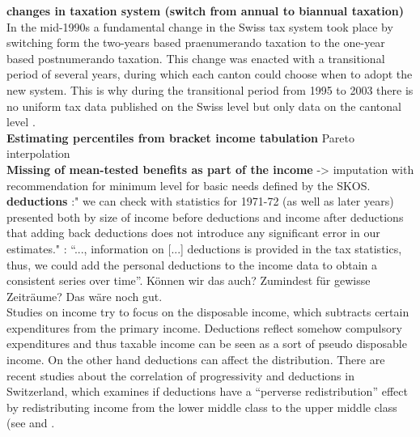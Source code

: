 \documentclass[twoside]{article}\usepackage[]{graphicx}\usepackage[]{color}
\begin{document}
\begin{multicols}{2}
\textbf{changes in taxation system  (switch from annual to biannual taxation)} In the mid-1990s a fundamental change in the Swiss tax system took place by switching form the two-years based praenumerando taxation to the one-year based postnumerando taxation. This change was enacted with a transitional period of several years, during which each canton could choose when to adopt the new system.  This is why during the transitional period from 1995 to 2003 there is no uniform tax data published on the Swiss level but only data on the cantonal level \citep[8f]{foellmi_volatile_2013}. \\

\textbf{Estimating percentiles from bracket income tabulation} Pareto interpolation \\ 

\textbf{Missing of mean-tested benefits as part of the income} -> imputation with recommendation for minimum level for basic needs defined by the SKOS.\\

\textbf{deductions} \citet[477]{dell_income_2007}:" we can check with statistics for 1971-72 (as well as later years) presented both by size of income before deductions and income after deductions that adding back deductions does not introduce any significant error in our estimates."
\citet[5]{schaltegger_evolution_2011 UNSICHER}: ``..., information on [...] deductions is provided in the tax statistics, thus, we could add the personal deductions to the income data to obtain a consistent series over time''. Können wir das auch? Zumindest für gewisse Zeiträume? Das wäre noch gut. \\

Studies on income try to focus on the disposable income, which subtracts certain expenditures from the primary income. Deductions reflect somehow compulsory expenditures and thus taxable income can be seen as a sort of pseudo disposable income. On the other hand deductions can affect the distribution. There are recent studies about the correlation of progressivity and deductions in Switzerland, which examines if deductions have a ``perverse redistribution'' effect by redistributing income from the lower middle class to the upper middle class (see \citealt{peters_steuerabzuge:_2011} and \citet{Interpellation Barbara Gysel (2009) FEHLT. das interpellation barbara sieht falsch aus}.


\end{multicols}
\end{document}

